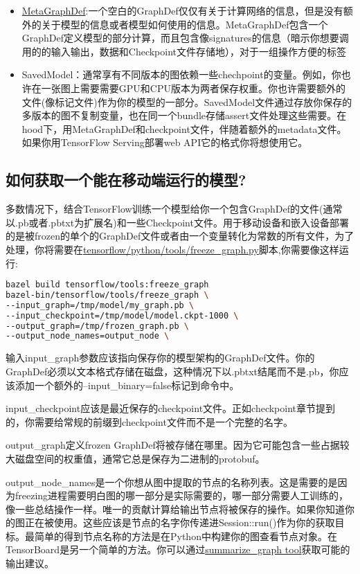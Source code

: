 \begin{itemize}
\item \href{https://www.github.com/tensorflow/tensorflow/blob/r1.4/tensorflow/core/protobuf/meta_graph.proto}{MetaGraphDef}:一个空白的GraphDef仅仅有关于计算网络的信息，但是没有额外的关于模型的信息或者模型如何使用的信息。MetaGraphDef包含一个GraphDef定义模型的部分计算，而且包含像signatures的信息（暗示你想要调用的的输入输出，数据和Checkpoint文件存储地），对于一组操作方便的标签
\item SavedModel：通常享有不同版本的图依赖一些chechpoint的变量。例如，你也许在一张图上需要需要GPU和CPU版本为两者保存权重。你也许需要额外的文件(像标记文件)作为你的模型的一部分。SavedModel文件通过存放你保存的多版本的图不复制变量，也在同一个bundle存储assert文件处理这些需要。在hood下，用MetaGraphDef和checkpoint文件，伴随着额外的metadata文件。如果你用TensorFlow Serving部署web API它的格式你将想使用它。
\end{itemize}
\subsection{如何获取一个能在移动端运行的模型?}
多数情况下，结合TensorFlow训练一个模型给你一个包含GraphDef的文件(通常以.pb或者.pbtxt为扩展名)和一些Checkpoint文件。用于移动设备和嵌入设备部署的是被frozen的单个的GraphDef文件或者由一个变量转化为常数的所有文件，为了处理，你将需要在\href{https://www.github.com/tensorflow/tensorflow/blob/r1.4/tensorflow/python/tools/freeze_graph.py}{tensorflow/python/tools/freeze\_graph.py}脚本,你需要像这样运行:
\begin{lstlisting}[language=Bash]
bazel build tensorflow/tools:freeze_graph
bazel-bin/tensorflow/tools/freeze_graph \
--input_graph=/tmp/model/my_graph.pb \
--input_checkpoint=/tmp/model/model.ckpt-1000 \
--output_graph=/tmp/frozen_graph.pb \
--output_node_names=output_node \
\end{lstlisting}
输入input\_graph参数应该指向保存你的模型架构的GraphDef文件。你的GraphDef必须以文本格式存储在磁盘，这种情况下以.pbtxt结尾而不是.pb，你应该添加一个额外的--input\_binary=false标记到命令中。

input\_checkpoint应该是最近保存的checkpoint文件。正如checkpoint章节提到的，你需要给常规的前缀到checkpoint文件而不是一个完整的名字。

output\_graph定义frozen GraphDef将被存储在哪里。因为它可能包含一些占据较大磁盘空间的权重值，通常它总是保存为二进制的protobuf。

output\_node\_names是一个你想从图中提取的节点的名称列表。这是需要的是因为freezing进程需要明白图的哪一部分是实际需要的，哪一部分需要人工训练的，像一些总结操作一样。唯一的贡献计算给输出节点将被保存的操作。如果你知道你的图正在被使用。这些应该是节点的名字你传递进Session::run()作为你的获取目标。最简单的得到节点名称的方法是在Python中构建你的图查看节点对象。在TensorBoard是另一个简单的方法。你可以通过\href{https://github.com/tensorflow/tensorflow/tree/master/tensorflow/tools/graph_transforms/README#inspecting-graphs}{summarize\_graph tool}获取可能的输出建议。

